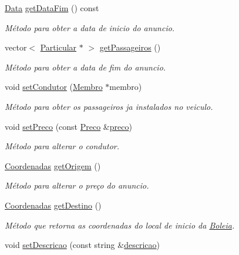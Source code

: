\begin{DoxyCompactItemize}
\hyperlink{class_data}{Data} \hyperlink{class_anuncio_a2e5adcc932f13615ab7bfc1e69964d4e}{get\+Data\+Fim} () const 
\begin{DoxyCompactList}\small\item\em Método para obter a data de inicio do anuncio. \end{DoxyCompactList}\item 
vector$<$ \hyperlink{class_particular}{Particular} $\ast$ $>$ \hyperlink{class_anuncio_a5dcd647bd001e6ccced77ffc213434f6}{get\+Passageiros} ()
\begin{DoxyCompactList}\small\item\em Método para obter a data de fim do anuncio. \end{DoxyCompactList}\item 
void \hyperlink{class_anuncio_aaede8d69a67be68cd3d8bfa0935f068b}{set\+Condutor} (\hyperlink{class_membro}{Membro} $\ast$membro)
\begin{DoxyCompactList}\small\item\em Método para obter os passageiros ja instalados no veiculo. \end{DoxyCompactList}\item 
void \hyperlink{class_anuncio_a2d6b1de1396b3ac962931dea7f50af3a}{set\+Preco} (const \hyperlink{class_preco}{Preco} \&\hyperlink{class_anuncio_aa780fd8e07586a3af117fd20593fb1b4}{preco})
\begin{DoxyCompactList}\small\item\em Método para alterar o condutor. \end{DoxyCompactList}\item 
\hyperlink{class_coordenadas}{Coordenadas} \hyperlink{class_anuncio_ac0f21112a31b6812a3128d9cac198c42}{get\+Origem} ()
\begin{DoxyCompactList}\small\item\em Método para alterar o preço do anuncio. \end{DoxyCompactList}\item 
\hyperlink{class_coordenadas}{Coordenadas} \hyperlink{class_anuncio_a12f2d6fa24c7255bb608e4c653740bb8}{get\+Destino} ()
\begin{DoxyCompactList}\small\item\em Método que retorna as coordenadas do local de inicio da \hyperlink{class_boleia}{Boleia}. \end{DoxyCompactList}\item 
void \hyperlink{class_anuncio_a8746d4708c5622947b17385414320e88}{set\+Descricao} (const string \&\hyperlink{class_anuncio_aa6a9eb8d08cb06d16061b006eb2c8b97}{descricao})

\end{DoxyCompactItemize}
